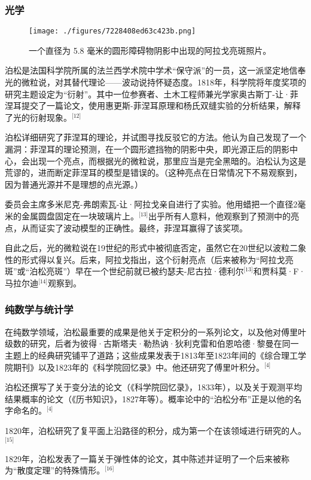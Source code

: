 \subsubsection{光学}
\begin{figure}[ht]
\centering
\texttt{[image: ./figures/7228408ed63c423b.png]}
\caption{一个直径为 5.8 毫米的圆形障碍物阴影中出现的阿拉戈亮斑照片。} \label{fig_BSDN_3}
\end{figure}
泊松是法国科学院所属的法兰西学术院中学术“保守派”的一员，这一派坚定地信奉光的微粒说，对其替代理论——波动说持怀疑态度。1818年，科学院将年度奖项的研究主题设定为“衍射”。其中一位参赛者、土木工程师兼光学家奥古斯丁-让·菲涅耳提交了一篇论文，使用惠更斯-菲涅耳原理和杨氏双缝实验的分析结果，解释了光的衍射现象。\(^\text{[12]}\)

泊松详细研究了菲涅耳的理论，并试图寻找反驳它的方法。他认为自己发现了一个漏洞：菲涅耳的理论预测，在一个圆形遮挡物的阴影中央，即光源正后的阴影中心，会出现一个亮点，而根据光的微粒说，那里应当是完全黑暗的。泊松认为这是荒谬的，进而断定菲涅耳的模型是错误的。（这种亮点在日常情况下不易观察到，因为普通光源并不是理想的点光源。）

委员会主席多米尼克-弗朗索瓦-让·阿拉戈亲自进行了实验。他用蜡把一个直径2毫米的金属圆盘固定在一块玻璃片上。\(^\text{[13]}\)出乎所有人意料，他观察到了预测中的亮点，从而证实了波动模型的正确性。最终，菲涅耳赢得了该奖项。

自此之后，光的微粒说在19世纪的形式中被彻底否定，虽然它在20世纪以波粒二象性的形式得以复兴。后来，阿拉戈指出，这个衍射亮点（后来被称为“阿拉戈亮斑”或“泊松亮斑”）早在一个世纪前就已被约瑟夫-尼古拉·德利尔\(^\text{[13]}\)和贾科莫·F·马拉尔迪\(^\text{[14]}\)观察到。
\subsubsection{纯数学与统计学}
在纯数学领域，泊松最重要的成果是他关于定积分的一系列论文，以及他对傅里叶级数的研究，后者为彼得·古斯塔夫·勒热讷·狄利克雷和伯恩哈德·黎曼在同一主题上的经典研究铺平了道路；这些成果发表于1813年至1823年间的《综合理工学院期刊》以及1823年的《科学院回忆录》中。他还研究了傅里叶积分。\(^\text{[4]}\)

泊松还撰写了关于变分法的论文（《科学院回忆录》，1833年），以及关于观测平均结果概率的论文（《历书知识》，1827年等）。概率论中的“泊松分布”正是以他的名字命名的。\(^\text{[4]}\)

1820年，泊松研究了复平面上沿路径的积分，成为第一个在该领域进行研究的人。\(^\text{[15]}\)

1829年，泊松发表了一篇关于弹性体的论文，其中陈述并证明了一个后来被称为“散度定理”的特殊情形。\(^\text{[16]}\)
